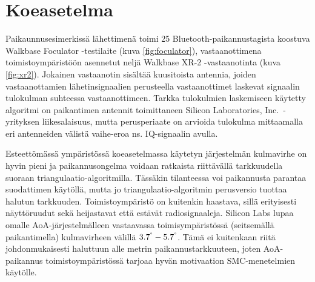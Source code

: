 \documentclass[
  12pt,
  a4paper, twoside]{book}
\begin{document}
\section{Koeasetelma}

Paikaunnusesimerkissä lähettimenä toimi 25 Bluetooth-paikannustagista koostuva Walkbase Foculator -testilaite (kuva \ref{fig:foculator}), vastaanottimena toimistoympäristöön asennetut neljä Walkbase XR-2 -vastaanotinta (kuva \ref{fig:xr2}). Jokainen vastaanotin sisältää kuusitoista antennia, joiden vastaanottamien lähetinsignaalien perusteella vastaanottimet laskevat signaalin tulokulman suhteessa vastaanottimeen. Tarkka tulokulmien laskemiseen käytetty algoritmi on paikantimen antennit toimittaneen Silicon Laboratories, Inc.~-yrityksen liikesalaisuus, mutta perusperiaate on arvioida tulokulma mittaamalla eri antenneiden välistä vaihe-eroa ns. IQ-signaalin avulla.

Esteettömässä ympäristössä koeasetelmassa käytetyn järjestelmän kulmavirhe on hyvin pieni ja paikannusongelma voidaan ratkaista riittävällä tarkkuudella suoraan triangulaatio-algoritmilla. Tässäkin tilanteessa voi paikannusta parantaa suodattimen käytöllä, mutta jo triangulaatio-algoritmin perusversio tuottaa halutun tarkkuuden. Toimistoympäristö on kuitenkin haastava, sillä erityisesti näyttöruudut sekä heijastavat että estävät radiosignaaleja. Silicon Labs lupaa omalle AoA-järjestelmälleen vastaavassa toimisympäristössä (seitsemällä paikantimella) kulmavirheen välillä \(3.7^\degree-5.7^\degree\). Tämä ei kuitenkaan riitä johdonmukaisesti haluttuun alle metrin paikannustarkkuuteen, joten AoA-paikannus toimistoympäristössä tarjoaa hyvän motivaation SMC-menetelmien käytölle.
\end{document}
